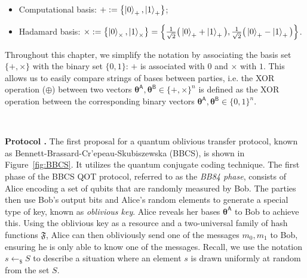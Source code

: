 \begin{itemize}
    \item Computational basis: $+ := \left\{\ket{0}_{+}, \ket{1}_{+}\right\}$;
    \item Hadamard basis: $\times := \left\{\ket{0}_{\times}, \ket{1}_{\times}\right\} = \left\{\frac{1}{\sqrt{2}}\big( \ket{0}_{+} + \ket{1}_{+} \big), \frac{1}{\sqrt{2}}\big( \ket{0}_{+} - \ket{1}_{+} \big) \right\}$.
\end{itemize}

Throughout this chapter, we simplify the notation by associating the basis set $\{+,\times\}$ with the binary set $\{0,1\}$: $+$ is associated with $0$ and $\times$ with $1$. This allows us to easily compare strings of bases between parties, i.e. the XOR operation ($\oplus$) between two vectors $\bm{\theta}^{\mathsf{A}}, \bm{\theta}^{\mathsf{B}} \in\{+,\times\}^n$ is defined as the XOR operation between the corresponding binary vectors $\bm{\theta}^{\mathsf{A}}, \bm{\theta}^{\mathsf{B}} \in\{0,1\}^n$.

\

\noindent\textbf{Protocol \cite{BBCS92}.} The first proposal for a quantum oblivious transfer protocol, known as Bennett-Brassard-Cr'{e}peau-Skubiszewska (BBCS), is shown in Figure~\ref{fig:BBCS}. It utilizes the quantum conjugate coding technique. The first phase of the BBCS QOT protocol, referred to as the \textit{BB84 phase}, consists of Alice encoding a set of qubits that are randomly measured by Bob. The parties then use Bob's output bits and Alice's random elements to generate a special type of key, known as \textit{oblivious key}. Alice reveals her bases $\bm{\theta}^{\mathsf{A}}$ to Bob to achieve this. Using the oblivious key as a resource and a two-universal family of hash functions $\mathfrak{F}$, Alice can then obliviously send one of the messages $m_0, m_1$ to Bob, ensuring he is only able to know one of the messages. Recall, we use the notation $s\leftarrow_{\$}S$ to describe a situation where an element $s$ is drawn uniformly at random from the set $S$.

